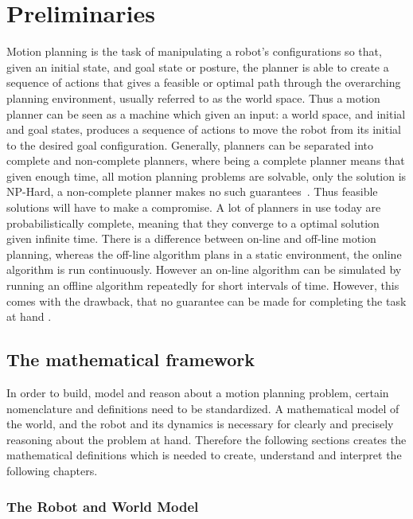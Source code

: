 \chapter{Preliminaries}
\label{chp:preliminaries}

Motion planning is the task of manipulating a robot's configurations so that,
given an initial state, and goal state or posture, the planner is able to create
a sequence of actions that gives a feasible or optimal path through the
overarching planning environment, usually referred to as the world space. Thus a
motion planner can be seen as a machine which given an input: a world space, and
initial and goal states, produces a sequence of actions to move the robot from
its initial to the desired goal configuration. Generally, planners can be
separated into complete and non-complete planners, where being a complete
planner means that given enough time, all motion planning problems are solvable,
only the solution is NP-Hard, a non-complete planner makes no such
guarantees~\cite{Lav06}. Thus feasible solutions will have to make a compromise.
A lot of planners in use today are probabilistically complete, meaning that they
converge to a optimal solution given infinite time. There is a difference
between on-line and off-line motion planning, whereas the off-line algorithm
plans in a static environment, the online algorithm is run continuously. However
an on-line algorithm can be simulated by running an offline algorithm repeatedly
for short intervals of time. However, this comes with the drawback, that no
guarantee can be made for completing the task at hand \cite{Lav06}.

\section{The mathematical framework}

In order to build, model and reason about a motion planning problem, certain
nomenclature and definitions need to be standardized. A mathematical model of
the world, and the robot and its dynamics is necessary for clearly and precisely
reasoning about the problem at hand. Therefore the following sections creates
the mathematical definitions which is needed to create, understand and interpret
the following chapters.

\subsection{The Robot and World Model}

